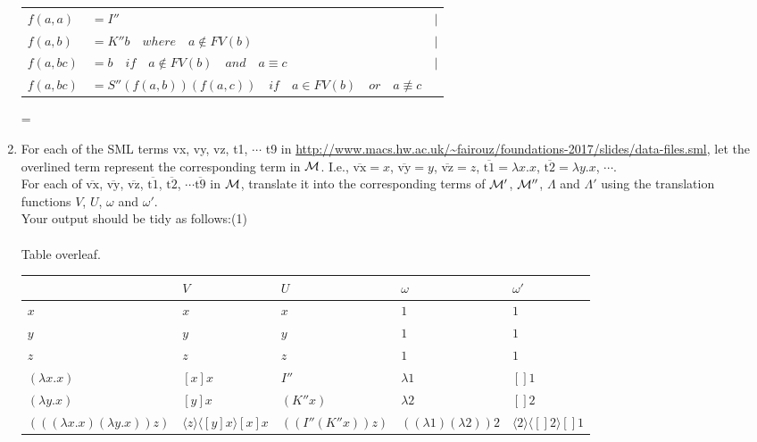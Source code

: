 \documentclass[11pt]{article}
\newenvironment{neverbreak} %
{\par\nobreak\vfil\penalty0\vfilneg
	\vtop\bgroup}
{\par\xdef\tpd{\the\prevdepth}\egroup
	\prevdepth=\tpd}
\begin{document}
\begin{enumerate}
\begin{neverbreak}
\begin{tabular}{lll}
		$f(a, a)$ & $= I''$ & $|$\\
		$f(a, b)$ & $= K''b \quad where\quad a \notin FV(b)$ & $|$\\
		$f(a, bc)$ & $= b \quad if \quad a \notin FV(b) \quad and \quad a\equiv c$&$|$\\
		$f(a, bc)$ & $= S''(f(a, b))(f(a, c))\quad if \quad a \in FV(b) \quad or \quad a\not \equiv c$\\
		\end{tabular}
		\end{neverbreak}
		\vspace{1cm}
    \item
      For each of the SML terms vx, vy, vz, t1, $\cdots$ t9 in \url{http://www.macs.hw.ac.uk/~fairouz/foundations-2017/slides/data-files.sml}, let the overlined term represent the corresponding term in ${\cal M}$.  I.e., $\overline{\mbox{vx}} = x$, $\overline{\mbox{vy}} = y$, $\overline{\mbox{vz}} = z$, $\overline{\mbox{t1}} = \lambda x.x$, $\overline{\mbox{t2}}
      = \lambda y.x$, $\cdots$.\\
      For each of $\overline{\mbox{vx}}$, $\overline{\mbox{vy}}$, $\overline{\mbox{vz}}$, $\overline{\mbox{t1}}$,
      $\overline{\mbox{t2}}$, $\cdots \overline{\mbox{t9}}$ in ${\cal M}$, translate it into the corresponding terms of ${\cal M}'$, ${\cal M}''$, $\Lambda$ and  $\Lambda'$ using the translation functions $V$, $U$, $\omega$ and $\omega'$.  \\
      Your output should be tidy as follows:\hfill{(1)} %
      \\ \\
      Table overleaf. \\
\begin{sideways}
\small
\centering
      \begin{tabular}{|l|l|l|l|l|}
        \hline
        & $V$&$U$&$\omega$&$\omega'$\\
        \hline
	$x$ & $x$ & $x$ & $1$ & $1$	\\
	$y$ & $y$ & $y$ & $1$ & $1$	\\
	$z$ & $z$ & $z$ & $1$ & $1$	\\
	$(\lambda x.x)$ & $[x]x$ & $I''$ & $\lambda 1$ & $[]1$	\\
	$(\lambda y.x)$ & $[y]x$ & $(K'' x)$ & $\lambda 2$ & $[]2$	\\
	$(((\lambda x.x) (\lambda y.x)) z)$ & $\langle z\rangle \langle [y]x\rangle [x]x$ & $((I'' (K'' x)) z)$ & $((\lambda 1)(\lambda 2))2$ & $ \langle2\rangle\langle[]2\rangle[]1$	\\

\end{tabular}
\end{sideways}
\end{enumerate}
\end{document}
